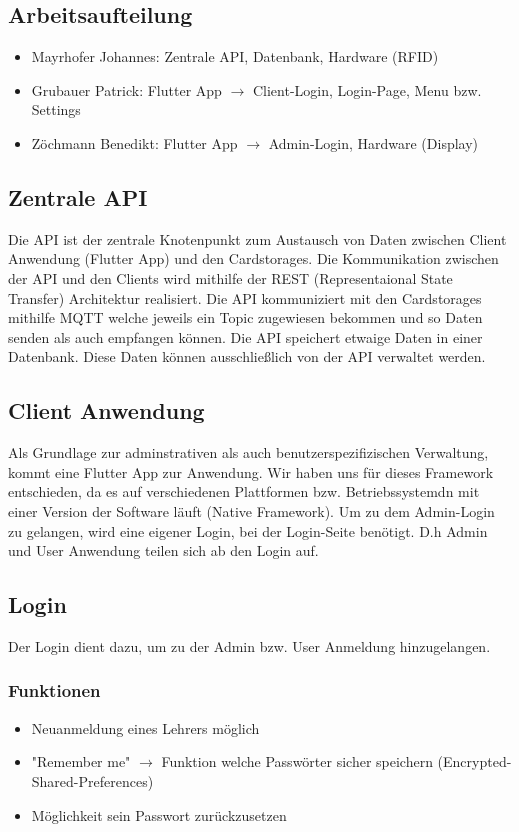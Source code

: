 \documentclass[a4paper]{article}
\begin{document}
\pagebreak

\subsection{Arbeitsaufteilung}
\begin{itemize}
  \item Mayrhofer Johannes: Zentrale API, Datenbank, Hardware (RFID)
  \item Grubauer Patrick: Flutter App $\rightarrow$ Client-Login, Login-Page, Menu bzw. Settings
  \item Zöchmann Benedikt: Flutter App $\rightarrow$ Admin-Login, Hardware (Display)
\end{itemize}

\subsection{Zentrale API}
Die API ist der zentrale Knotenpunkt zum Austausch von Daten zwischen Client Anwendung (Flutter App) und den Cardstorages. Die Kommunikation zwischen der API und den Clients wird mithilfe der REST (Representaional State Transfer) Architektur realisiert. Die API kommuniziert mit den Cardstorages mithilfe MQTT welche jeweils ein Topic zugewiesen bekommen und so Daten senden als auch empfangen können. Die API speichert etwaige Daten in einer Datenbank. Diese Daten können ausschließlich von der API verwaltet werden. 

\subsection{Client Anwendung}
Als Grundlage zur adminstrativen als auch benutzerspezifizischen Verwaltung, kommt eine Flutter App zur Anwendung. Wir haben uns für dieses Framework entschieden, da es auf verschiedenen Plattformen bzw. Betriebssystemdn mit einer Version der Software läuft (Native Framework). Um zu dem Admin-Login zu gelangen, wird eine eigener Login, bei der Login-Seite benötigt. D.h Admin und User Anwendung teilen sich ab den Login auf.

\subsection{Login}
Der Login dient dazu, um zu der Admin bzw. User Anmeldung hinzugelangen.
\subsubsection{Funktionen}
\begin{itemize}
  \item Neuanmeldung eines Lehrers möglich
  \item "Remember me" $\rightarrow$ Funktion welche Passwörter sicher speichern (Encrypted-Shared-Preferences)
  \item Möglichkeit sein Passwort zurückzusetzen  
\end{itemize}
\end{document}
